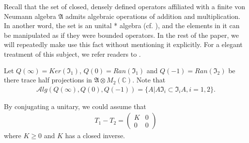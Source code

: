 \documentclass[a4paper,10pt]{amsart}
\newcommand{\AAA}{\mathfrak A}
\newcommand{\II}{\mathfrak I}
\newcommand{\Alg}{\mathcal Alg}
\newcommand{\C}{\mathbb C} %
\begin{document}
Recall that the set of closed, densely defined operators 
affiliated with a finite von Neumann algebra $\AAA$
admits algebraic operations of addition and multiplication.
In another word, the set is an unital * algebra (cf. \cite{MV2}), 
and the elements in it can be manipulated as if they were bounded
operators. In the rest of the paper, we will repeatedly make use this fact 
without mentioning it explicitly. For a elegant treatment of this subject, 
we refer readers to \cite{Zhe}. 

Let $Q(\infty)=Ker(\II_1)$, $Q(0)=Ran(\II_{1})$ and $Q(-1)=Ran(\II_{2})$
be there trace half projections in $\AAA \otimes M_{2}(\C)$.
Note that
\begin{align*}
   \Alg(Q(\infty), Q(0), Q(-1)) = \{A | A\II_i \subset \II_{i}A, i = 1,2\}.
\end{align*}

By conjugating a unitary, we could assume that
\begin{align*}
   T_1 - T_2  
   = \begin{pmatrix}
      K & 0\\
      0 & 0
   \end{pmatrix} 
\end{align*}
where $K \geq 0$ and $K$ has a closed inverse. 
\end{document}
